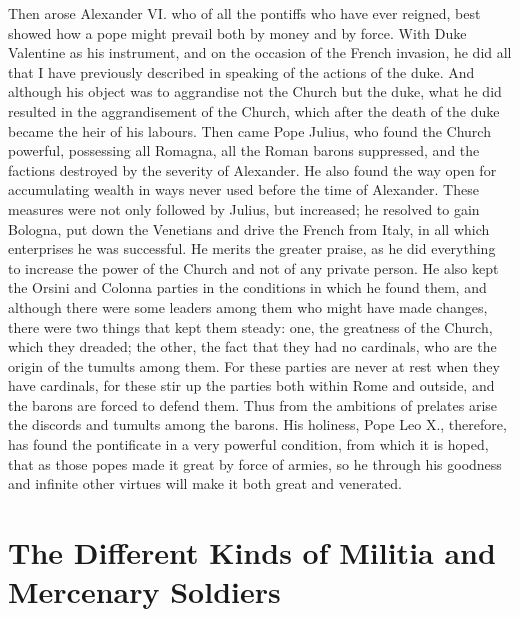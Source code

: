 \documentclass[12pt,letterpaper]{memoir}
\begin{document}
Then arose Alexander VI. who of all the pontiffs who have ever
reigned, best showed how a pope might prevail both by money and by
force. With Duke Valentine as his instrument, and on the occasion of
the French invasion, he did all that I have previously described
in speaking of the actions of the duke. And although his object was
to aggrandise not the Church but the duke, what he did resulted in
the aggrandisement of the Church, which after the death of the duke
became the heir of his labours. Then came Pope Julius, who found
the Church powerful, possessing all Romagna, all the Roman barons
suppressed, and the factions destroyed by the severity of Alexander.
He also found the way open for accumulating wealth in ways never used
before the time of Alexander. These measures were not only followed
by Julius, but increased; he resolved to gain Bologna, put down the
Venetians and drive the French from Italy, in all which enterprises
he was successful. He merits the greater praise, as he did everything
to increase the power of the Church and not of any private person. He
also kept the Orsini and Colonna parties in the conditions in which he
found them, and although there were some leaders among them who might
have made changes, there were two things that kept them steady: one,
the greatness of the Church, which they dreaded; the other, the fact
that they had no cardinals, who are the origin of the tumults among
them. For these parties are never at rest when they have cardinals,
for these stir up the parties both within Rome and outside, and the
barons are forced to defend them. Thus from the ambitions of prelates
arise the discords and tumults among the barons. His holiness, Pope Leo
X., therefore, has found the pontificate in a very powerful condition,
from which it is hoped, that as those popes made it great by force of
armies, so he through his goodness and infinite other virtues will make
it both great and venerated.

\chapter{The Different Kinds of Militia and Mercenary Soldiers}
\end{document}
